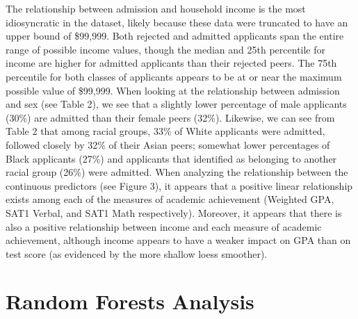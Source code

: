 \documentclass[titlepage]{article}   	%
\begin{document}
The relationship between admission and household income is the most idiosyncratic in the dataset, likely because these data were truncated to have an upper bound of \$99,999. Both rejected and admitted applicants span the entire range of possible income values, though the median and 25th percentile for income are higher for admitted applicants than their rejected peers. The 75th percentile for both classes of applicants appears to be at or near the maximum possible value of \$99,999. When looking at the relationship between admission and sex (see Table 2), we see that a slightly lower percentage of male applicants (30\%) are admitted than their female peers (32\%). Likewise, we can see from Table 2 that among racial groups,  33\% of White applicants were admitted, followed closely by 32\% of their Asian peers; somewhat lower percentages of Black applicants (27\%) and applicants that identified as belonging to another racial group (26\%) were admitted. When analyzing the relationship between the continuous predictors (see Figure 3), it appears that a positive linear relationship exists among each of the measures of academic achievement (Weighted GPA, SAT1 Verbal, and SAT1 Math respectively). Moreover, it appears that there is also a positive relationship between income and each measure of academic achievement, although income appears to have a weaker impact on GPA than on test score (as evidenced by the more shallow loess smoother). 

\section{Random Forests Analysis}
\end{document}
